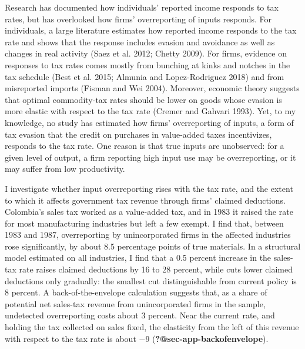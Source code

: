 \documentclass[
  12pt]{article}
\begin{document}
Research has documented how individuals' reported income responds to tax
rates, but has overlooked how firms' overreporting of inputs responds.
For individuals, a large literature estimates how reported income
responds to the tax rate and shows that the response includes evasion
and avoidance as well as changes in real activity (Saez et al. 2012;
Chetty 2009). For firms, evidence on responses to tax rates comes mostly
from bunching at kinks and notches in the tax schedule (Best et al.
2015; Almunia and Lopez-Rodriguez 2018) and from misreported imports
(Fisman and Wei 2004). Moreover, economic theory suggests that optimal
commodity-tax rates should be lower on goods whose evasion is more
elastic with respect to the tax rate (Cremer and Gahvari 1993). Yet, to
my knowledge, no study has estimated how firms' overreporting of inputs,
a form of tax evasion that the credit on purchases in value-added taxes
incentivizes, responds to the tax rate. One reason is that true inputs
are unobserved: for a given level of output, a firm reporting high input
use may be overreporting, or it may suffer from low productivity.

I investigate whether input overreporting rises with the tax rate, and
the extent to which it affects government tax revenue through firms'
claimed deductions. Colombia's sales tax worked as a value-added tax,
and in 1983 it raised the rate for most manufacturing industries but
left a few exempt. I find that, between 1983 and 1987, overreporting by
unincorporated firms in the affected industries rose significantly, by
about 8.5 percentage points of true materials. In a structural model
estimated on all industries, I find that a 0.5 percent increase in the
sales-tax rate raises claimed deductions by 16 to 28 percent, while cuts
lower claimed deductions only gradually: the smallest cut
distinguishable from current policy is 8 percent. A back-of-the-envelope
calculation suggests that, as a share of potential net sales-tax revenue
from unincorporated firms in the sample, undetected overreporting costs
about 3 percent. Near the current rate, and holding the tax collected on
sales fixed, the elasticity from the left of this revenue with respect
to the tax rate is about −9 (\textbf{?@sec-app-backofenvelope}).
\end{document}
